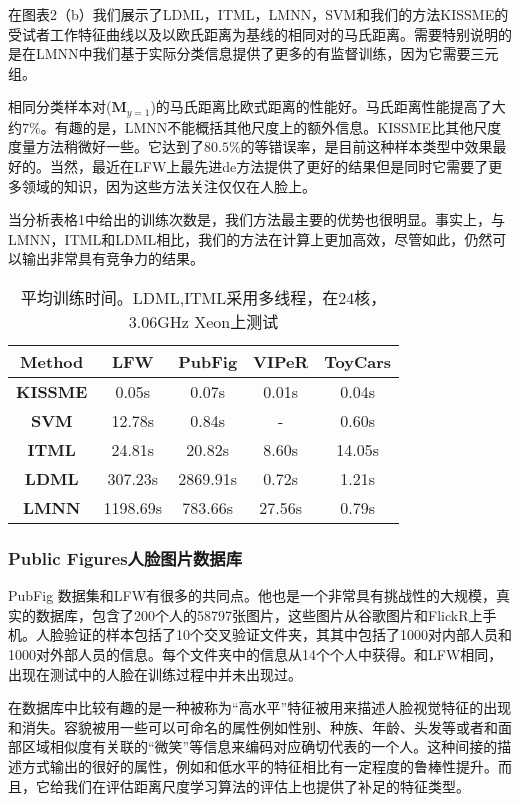 在图表2（b）我们展示了LDML\cite{guillaumin2009you}，ITML\cite{davis2007information}，LMNN\cite{weinberger2009distance}，SVM\cite{chang2011libsvm}和我们的方法KISSME的受试者工作特征曲线以及以欧氏距离为基线的相同对的马氏距离。需要特别说明的是在LMNN中我们基于实际分类信息提供了更多的有监督训练，因为它需要三元组。

相同分类样本对($\mathbf M_{y=1}$)的马氏距离比欧式距离的性能好。马氏距离性能提高了大约$7\%$。有趣的是，LMNN不能概括其他尺度上的额外信息。KISSME比其他尺度度量方法稍微好一些。它达到了$80.5\%$的等错误率，是目前这种样本类型中效果最好的。当然，最近在LFW上最先进de方法提供了更好的结果但是同时它需要了更多领域的知识，因为这些方法关注仅仅在人脸上。

当分析表格1中给出的训练次数是，我们方法最主要的优势也很明显。事实上，与LMNN，ITML和LDML相比，我们的方法在计算上更加高效，尽管如此，仍然可以输出非常具有竞争力的结果。
\renewcommand\tablename{表格}
\begin{table}[!hbp]
\centering
\renewcommand\arraystretch{1.5}
\begin{tabular}{|c|c|c|c|c|}
\hline
 \textbf{Method}  & \textbf{LFW} & \textbf{PubFig} & \textbf{VIPeR} &  \textbf{ToyCars} \\
 \hline
 \textbf{KISSME } & 0.05s & 0.07s & 0.01s & 0.04s \\
 \hline
 \textbf{SVM}  & 12.78s & 0.84s & - & 0.60s \\
 \hline
 \textbf{ITML} & 24.81s & 20.82s & 8.60s & 14.05s \\
 \hline
 \textbf{LDML} & 307.23s & 2869.91s & 0.72s & 1.21s \\
 \hline
 \textbf{LMNN} & 1198.69s & 783.66s & 27.56s & 0.79s \\
 \hline
\end{tabular}
\caption{平均训练时间。LDML,ITML采用多线程，在24核，3.06GHz Xeon上测试}
\end{table}
\subsubsection{Public Figures人脸图片数据库}
PubFig 数据集\cite{kumar2009attribute}和LFW有很多的共同点。他也是一个非常具有挑战性的大规模，真实的数据库，包含了200个人的58797张图片，这些图片从谷歌图片和FlickR上手机。人脸验证的样本包括了10个交叉验证文件夹，其其中包括了1000对内部人员和1000对外部人员的信息。每个文件夹中的信息从14个个人中获得。和LFW相同，出现在测试中的人脸在训练过程中并未出现过。

在数据库中比较有趣的是一种被称为“高水平”特征被用来描述人脸视觉特征的出现和消失。容貌被用一些可以可命名的属性例如性别、种族、年龄、头发等或者和面部区域相似度有关联的“微笑”等信息来编码对应确切代表的一个人。这种间接的描述方式输出的很好的属性，例如和低水平的特征相比有一定程度的鲁棒性提升。而且，它给我们在评估距离尺度学习算法的评估上也提供了补足的特征类型。

